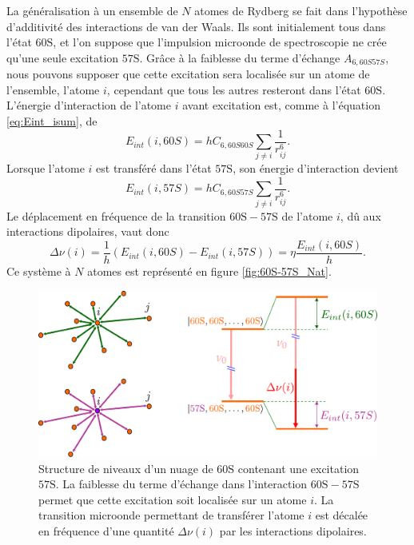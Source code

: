 La généralisation à un ensemble de $N$ atomes de Rydberg se fait dans l'hypothèse d'additivité des interactions de van der Waals.
Ils sont initialement tous dans l'état $\mathrm{60S}$, et l'on suppose que l'impulsion microonde de spectroscopie ne crée qu'une seule excitation $\mathrm{57S}$.
Grâce à la faiblesse du terme d'échange $A_{6,60S57S}$, nous pouvons supposer que cette excitation sera localisée sur un atome de l'ensemble, l'atome $i$, cependant que tous les autres resteront dans l'état $\mathrm{60S}$.
L'énergie d'interaction de l'atome $i$ avant excitation est, comme à l'équation \eqref{eq:Eint_isum}, de
\begin{equation}
\label{eq:Eint_i60S}
E_{int}(i,60S) = hC_{6,60S60S}\sum_{j\neq i} \frac{1}{r_{ij}^6}.
\end{equation}
Lorsque l'atome $i$ est transféré dans l'état $\mathrm{57S}$, son énergie d'interaction devient
\begin{equation}
\label{eq:Eint_i57S}
E_{int}(i,57S) = hC_{6,60S57S}\sum_{j\neq i} \frac{1}{r_{ij}^6}.
\end{equation}
Le déplacement en fréquence de la transition $\mathrm{60S-57S}$ de l'atome $i$, dû aux interactions dipolaires, vaut donc
\begin{equation}
\label{eq:DeltaNu_i}
\Delta\nu (i) = \frac{1}{h}(E_{int}(i,60S)-E_{int}(i,57S)) = \eta \frac{E_{int}(i,60S)}{h}.
\end{equation}
Ce système à $N$ atomes est représenté en figure \eqref{fig:60S-57S_Nat}.
%
\begin{figure}[!h]
\centering
\includegraphics[width=\linewidth]{figures/low_l/60S-57S_Nat}
\caption[Structure de niveaux d'un nuage de $\mathrm{60S}$ contenant une excitation $\mathrm{57S}$]{
Structure de niveaux d'un nuage de $\mathrm{60S}$ contenant une excitation $\mathrm{57S}$.
La faiblesse du terme d'échange dans l'interaction $\mathrm{60S-57S}$ permet que cette excitation soit localisée sur un atome $i$.
La transition microonde permettant de transférer l'atome $i$ est décalée en fréquence d'une quantité $\Delta\nu(i)$ par les interactions dipolaires.
}
\label{fig:60S-57S_Nat}
\end{figure}
